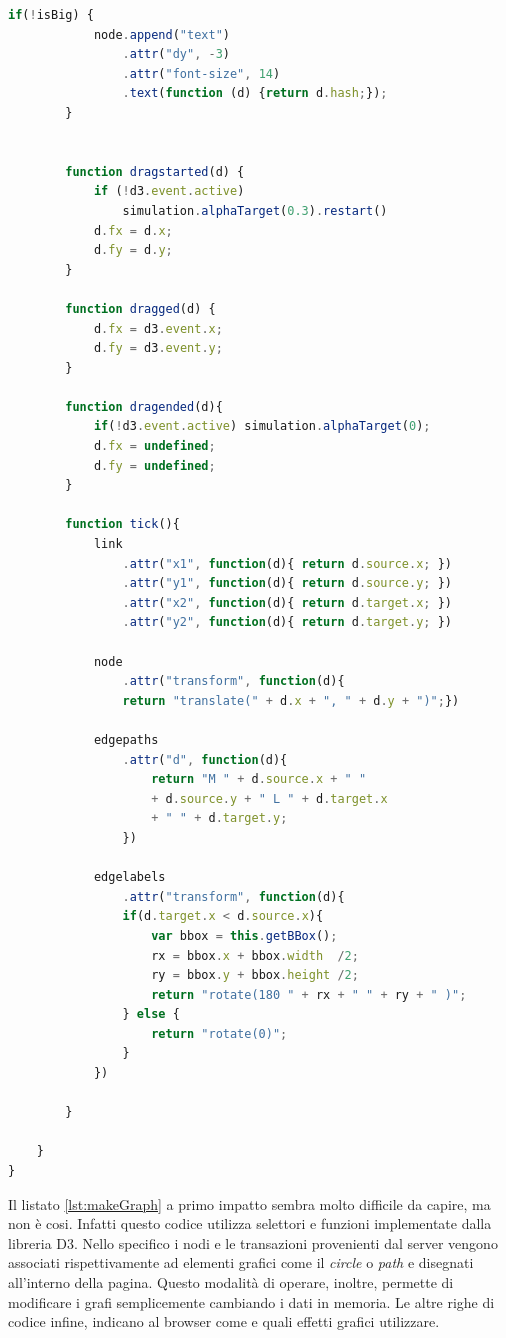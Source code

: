 \begin{itemize}
\begin{lstlisting}[language=Javascript, label=lst:makeGraph, caption={Funzione per grafi.}]
        if(!isBig) {
            node.append("text")
                .attr("dy", -3)
                .attr("font-size", 14)
                .text(function (d) {return d.hash;});
        }


        function dragstarted(d) {
            if (!d3.event.active) 
            	simulation.alphaTarget(0.3).restart()
            d.fx = d.x;
            d.fy = d.y;
        }

        function dragged(d) {
            d.fx = d3.event.x;
            d.fy = d3.event.y;
        }

        function dragended(d){
            if(!d3.event.active) simulation.alphaTarget(0);
            d.fx = undefined;
            d.fy = undefined;
        }

        function tick(){
            link
                .attr("x1", function(d){ return d.source.x; })
                .attr("y1", function(d){ return d.source.y; })
                .attr("x2", function(d){ return d.target.x; })
                .attr("y2", function(d){ return d.target.y; })

            node
                .attr("transform", function(d){ 
                return "translate(" + d.x + ", " + d.y + ")";})

            edgepaths
                .attr("d", function(d){
                    return "M " + d.source.x + " " 
                    + d.source.y + " L " + d.target.x 
                    + " " + d.target.y;
                })

            edgelabels
                .attr("transform", function(d){
                if(d.target.x < d.source.x){
                    var bbox = this.getBBox();
                    rx = bbox.x + bbox.width  /2;
                    ry = bbox.y + bbox.height /2;
                    return "rotate(180 " + rx + " " + ry + " )";
                } else {
                    return "rotate(0)";
                }
            })

        }

    }
}
\end{lstlisting}

Il listato \ref{lst:makeGraph} a primo impatto sembra molto difficile da capire, ma non è cosi. Infatti questo codice utilizza selettori e funzioni implementate dalla libreria D3. Nello specifico i nodi e le transazioni provenienti dal server vengono associati rispettivamente ad elementi grafici come il \textit{circle} o \textit{path} e disegnati all'interno della pagina. Questo modalità di operare, inoltre, permette di modificare i grafi semplicemente cambiando i dati in memoria. Le altre righe di codice infine, indicano al browser come e quali effetti grafici utilizzare.
 

\end{itemize}
